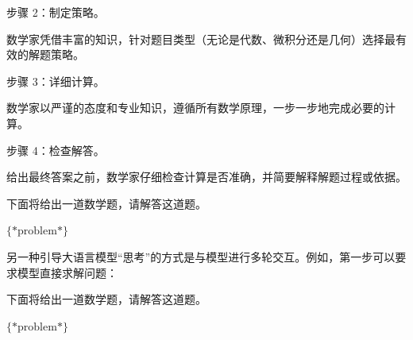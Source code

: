 \begin{itemize}
\begin{tcolorbox}
    \vspace{0.5em}

    步骤 2：制定策略。

    数学家凭借丰富的知识，针对题目类型（无论是代数、微积分还是几何）选择最有效的解题策略。

    \vspace{0.5em}

    步骤 3：详细计算。

    数学家以严谨的态度和专业知识，遵循所有数学原理，一步一步地完成必要的计算。

    \vspace{0.5em}

    步骤 4：检查解答。

    给出最终答案之前，数学家仔细检查计算是否准确，并简要解释解题过程或依据。

    \vspace{0.5em}

    下面将给出一道数学题，请解答这道题。

    \vspace{0.5em}

    $\{*\mathrm{problem}*\}$

    \vspace{0.5em}

    \underline{\hspace{2em}}

    \endgroup

    \end{tcolorbox}
    \vspace{0.5em}

    另一种引导大语言模型“思考”的方式是与模型进行多轮交互。例如，第一步可以要求模型直接求解问题：

    \vspace{0.5em}
    \begin{tcolorbox}

    \begingroup
    \setlength{\leftskip}{2em}
    \setlength{\rightskip}{2em}

    下面将给出一道数学题，请解答这道题。

    \vspace{0.3em}

    $\{*\mathrm{problem}*\}$

    \underline{\hspace{2em}}

    \endgroup

    \end{tcolorbox}
    \vspace{0.5em}


\end{itemize}
